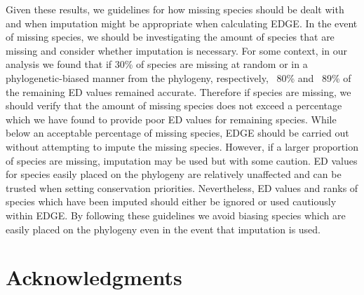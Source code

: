 \documentclass[12pt,english]{article}
\begin{document}
Given these results, we 
guidelines for how missing species should be dealt with and when
imputation might be appropriate when calculating EDGE. In the event of
missing species, we should be investigating the amount of species that
are missing and consider whether imputation is necessary.
For some context, in our analysis we found that if 30\% of species
are missing at random or in a phylogenetic-biased manner from the phylogeny,
respectively, ~80\% and ~89\% of the remaining ED values remained accurate.
Therefore if species are missing, we should verify that the amount of missing
species does not exceed a percentage which we have found to provide poor ED
values for remaining species. While below an acceptable percentage of missing
species, EDGE should be carried out without attempting to impute the
missing species.
However, if a larger proportion of species are missing, imputation may
be used but with some caution. ED values for species easily placed on
the phylogeny are relatively unaffected and can be trusted when
setting conservation priorities. Nevertheless, ED values and ranks of
species which have been imputed should either be ignored or used
cautiously within EDGE.
By following these guidelines we avoid biasing species which are
easily placed on the phylogeny even in the event that imputation is
used.

\section*{Acknowledgments}
\end{document}

